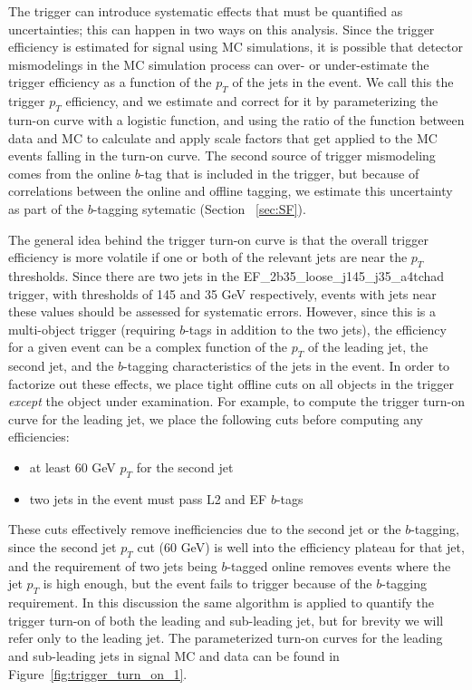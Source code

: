 The trigger can introduce systematic effects that must be quantified as uncertainties; 
this can happen in two ways on this analysis.  Since the trigger efficiency is estimated
for signal using MC simulations, it is possible that detector mismodelings in the MC 
simulation process can over- or under-estimate the trigger efficiency as a function 
of the $p_T$ of the jets in the event.  We call this the trigger $p_T$ efficiency,
and we estimate and correct for it by parameterizing the turn-on curve with a logistic
function, and using the ratio of the function between data and MC to calculate and 
apply scale factors that get applied to the MC events falling in the turn-on curve.  
The second source of trigger mismodeling comes from the online $b$-tag that is
included in the trigger, but because of correlations between the online and offline tagging,
we estimate this uncertainty as part of the $b$-tagging sytematic (Section ~\ref{sec:SF}).


The general idea behind the trigger turn-on curve is that the overall trigger efficiency
is more volatile if one or both of the relevant jets are near the $p_T$ thresholds.
Since there are two jets in the EF\_2b35\_loose\_j145\_j35\_a4tchad trigger, with thresholds
of 145 and 35 GeV respectively, events with jets near these values should be assessed
for systematic errors.  However, since this is a multi-object trigger (requiring $b$-tags
in addition to the two jets), the efficiency for a given event can be a complex function
of the $p_T$ of the leading jet, the second jet, and the $b$-tagging characteristics of
the jets in the event.  In order to factorize out these effects, we place tight offline
cuts on all objects in the trigger \textit{except} the object under examination. For example, 
to compute the trigger turn-on curve for the leading jet, we place the following cuts before
computing any efficiencies: 
\begin{itemize}
    \item at least 60 GeV $p_T$ for the second jet
    \item two jets in the event must pass L2 and EF $b$-tags
\end{itemize}

These cuts effectively remove inefficiencies due to the second jet or the $b$-tagging,
since the second jet $p_T$ cut (60 GeV) is well into the efficiency plateau for that
jet, and the requirement of two jets being $b$-tagged online removes events where the
jet $p_T$ is high enough, but the event fails to trigger because of the $b$-tagging requirement.  
In this discussion the same algorithm is applied to quantify
the trigger turn-on of both the leading and sub-leading jet, but for brevity we will
refer only to the leading jet.  The parameterized turn-on curves for the leading and 
sub-leading jets in signal MC and data can be found in Figure~\ref{fig:trigger_turn_on_1}.

